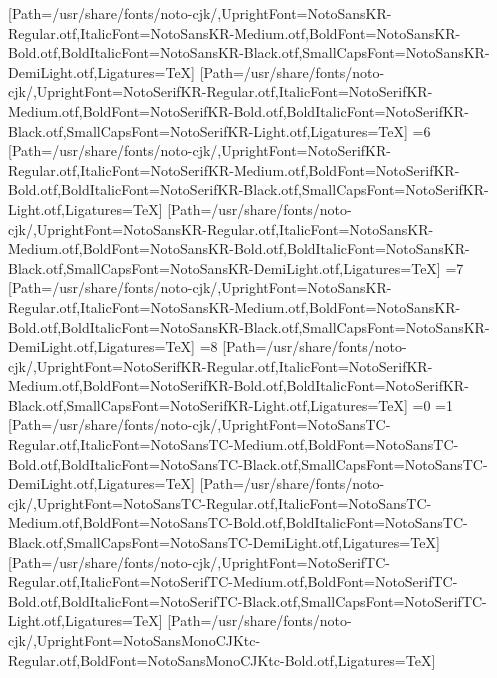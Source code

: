 [Path=/usr/share/fonts/noto-cjk/,UprightFont=NotoSansKR-Regular.otf,ItalicFont=NotoSansKR-Medium.otf,BoldFont=NotoSansKR-Bold.otf,BoldItalicFont=NotoSansKR-Black.otf,SmallCapsFont=NotoSansKR-DemiLight.otf,Ligatures=TeX]
[Path=/usr/share/fonts/noto-cjk/,UprightFont=NotoSerifKR-Regular.otf,ItalicFont=NotoSerifKR-Medium.otf,BoldFont=NotoSerifKR-Bold.otf,BoldItalicFont=NotoSerifKR-Black.otf,SmallCapsFont=NotoSerifKR-Light.otf,Ligatures=TeX]
\else\ifnum\value{CJKFonts}=6
[Path=/usr/share/fonts/noto-cjk/,UprightFont=NotoSerifKR-Regular.otf,ItalicFont=NotoSerifKR-Medium.otf,BoldFont=NotoSerifKR-Bold.otf,BoldItalicFont=NotoSerifKR-Black.otf,SmallCapsFont=NotoSerifKR-Light.otf,Ligatures=TeX]
[Path=/usr/share/fonts/noto-cjk/,UprightFont=NotoSansKR-Regular.otf,ItalicFont=NotoSansKR-Medium.otf,BoldFont=NotoSansKR-Bold.otf,BoldItalicFont=NotoSansKR-Black.otf,SmallCapsFont=NotoSansKR-DemiLight.otf,Ligatures=TeX]
\else\ifnum\value{CJKFonts}=7
[Path=/usr/share/fonts/noto-cjk/,UprightFont=NotoSansKR-Regular.otf,ItalicFont=NotoSansKR-Medium.otf,BoldFont=NotoSansKR-Bold.otf,BoldItalicFont=NotoSansKR-Black.otf,SmallCapsFont=NotoSansKR-DemiLight.otf,Ligatures=TeX]
\else\ifnum\value{CJKFonts}=8
[Path=/usr/share/fonts/noto-cjk/,UprightFont=NotoSerifKR-Regular.otf,ItalicFont=NotoSerifKR-Medium.otf,BoldFont=NotoSerifKR-Bold.otf,BoldItalicFont=NotoSerifKR-Black.otf,SmallCapsFont=NotoSerifKR-Light.otf,Ligatures=TeX]
\fi\fi\fi\fi\fi\fi\fi\fi\fi\fi\fi\fi\fi\fi
\ifnum\value{NotoCJKFamily}=0
\else\ifnum\value{NotoCJKFamily}=1
\newfontfamily{}[Path=/usr/share/fonts/noto-cjk/,UprightFont=NotoSansTC-Regular.otf,ItalicFont=NotoSansTC-Medium.otf,BoldFont=NotoSansTC-Bold.otf,BoldItalicFont=NotoSansTC-Black.otf,SmallCapsFont=NotoSansTC-DemiLight.otf,Ligatures=TeX]
\newfontfamily{}[Path=/usr/share/fonts/noto-cjk/,UprightFont=NotoSansTC-Regular.otf,ItalicFont=NotoSansTC-Medium.otf,BoldFont=NotoSansTC-Bold.otf,BoldItalicFont=NotoSansTC-Black.otf,SmallCapsFont=NotoSansTC-DemiLight.otf,Ligatures=TeX]
\newfontfamily{}[Path=/usr/share/fonts/noto-cjk/,UprightFont=NotoSerifTC-Regular.otf,ItalicFont=NotoSerifTC-Medium.otf,BoldFont=NotoSerifTC-Bold.otf,BoldItalicFont=NotoSerifTC-Black.otf,SmallCapsFont=NotoSerifTC-Light.otf,Ligatures=TeX]
\newfontfamily{}[Path=/usr/share/fonts/noto-cjk/,UprightFont=NotoSansMonoCJKtc-Regular.otf,BoldFont=NotoSansMonoCJKtc-Bold.otf,Ligatures=TeX]
